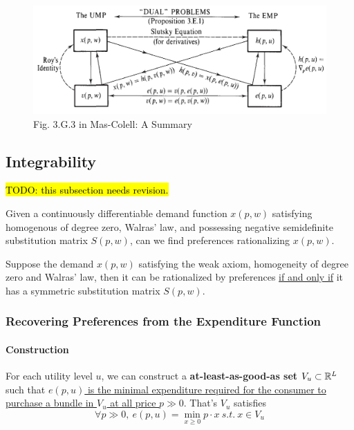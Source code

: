 \documentclass{report}
\begin{document}
 			\begin{figure}[h]
 				\centering
 				\includegraphics[width=1.0\linewidth]{figures/duality}
 				\caption{Fig. 3.G.3 in Mas-Colell: A Summary}
 			\end{figure}
 		
 		\subsection{Integrability}
 			\par \hl{TODO: this subsection needs revision.}
 			\begin{remark}
 				Given a continuously differentiable demand function $x(p, w)$ satisfying homogenous of degree zero, Walras' law, and possessing negative semidefinite substitution matrix $S(p, w)$, can we find preferences rationalizing $x(p,w)$.
 			\end{remark}
 			
 			\begin{proposition}
 				Suppose the demand $x(p, w)$ satisfying the weak axiom, homogeneity of degree zero and Walras' law, then it can be rationalized by preferences \ul{if and only if} it has a symmetric substitution matrix $S(p, w)$.
 			\end{proposition}
 			
 			\subsubsection{Recovering Preferences from the Expenditure Function}
 			
 			\paragraph{Construction}For each utility level $u$, we can construct a \textbf{at-least-as-good-as set} $V_u \subset \mathbb{R}^L$ such that \ul{$e(p, u)$ is the minimal expenditure required for the consumer to purchase a bundle in $V_u$ at all price $p \gg 0$}. That's $V_u$ satisfies
 			\begin{equation}
 				\forall p \gg 0,\ e(p, u) = \min_{x \geq 0} p \cdot x\ s.t.\ x \in V_u
 			\end{equation}
 			
\end{document}

